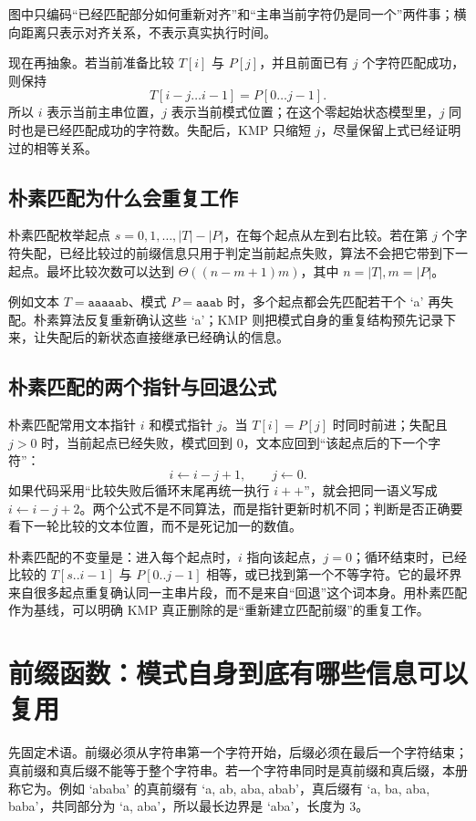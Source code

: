 \documentclass[UTF8,fontset=none,11pt,a4paper]{ctexart}
\begin{document}
\begin{center}
\resizebox{0.94\linewidth}{!}{}
\end{center}
图中只编码“已经匹配部分如何重新对齐”和“主串当前字符仍是同一个”两件事；横向距离只表示对齐关系，不表示真实执行时间。

现在再抽象。若当前准备比较 $T[i]$ 与 $P[j]$，并且前面已有 $j$ 个字符匹配成功，则保持
\[
T[i-j\ldots i-1]=P[0\ldots j-1].
\]
所以 $i$ 表示当前主串位置，$j$ 表示当前模式位置；在这个零起始状态模型里，$j$ 同时也是已经匹配成功的字符数。失配后，KMP 只缩短 $j$，尽量保留上式已经证明过的相等关系。

\subsection{朴素匹配为什么会重复工作}
朴素匹配枚举起点 $s=0,1,\ldots,\lvert T\rvert-\lvert P\rvert$，在每个起点从左到右比较。若在第 $j$ 个字符失配，已经比较过的前缀信息只用于判定当前起点失败，算法不会把它带到下一起点。最坏比较次数可以达到 $\Theta((n-m+1)m)$，其中 $n=\lvert T\rvert,m=\lvert P\rvert$。

例如文本 $T=\texttt{aaaaab}$、模式 $P=\texttt{aaab}$ 时，多个起点都会先匹配若干个 `a' 再失配。朴素算法反复重新确认这些 `a'；KMP 则把模式自身的重复结构预先记录下来，让失配后的新状态直接继承已经确认的信息。

\subsection{朴素匹配的两个指针与回退公式}
朴素匹配常用文本指针 $i$ 和模式指针 $j$。当 $T[i]=P[j]$ 时同时前进；失配且 $j>0$ 时，当前起点已经失败，模式回到 $0$，文本应回到“该起点后的下一个字符”：
\[
i\leftarrow i-j+1,\qquad j\leftarrow0.
\]
如果代码采用“比较失败后循环末尾再统一执行 $i++$”，就会把同一语义写成 $i\leftarrow i-j+2$。两个公式不是不同算法，而是指针更新时机不同；判断是否正确要看下一轮比较的文本位置，而不是死记加一的数值。

朴素匹配的不变量是：进入每个起点时，$i$ 指向该起点，$j=0$；循环结束时，已经比较的 $T[s..i-1]$ 与 $P[0..j-1]$ 相等，或已找到第一个不等字符。它的最坏界来自很多起点重复确认同一主串片段，而不是来自“回退”这个词本身。用朴素匹配作为基线，可以明确 KMP 真正删除的是“重新建立匹配前缀”的重复工作。

\section{前缀函数：模式自身到底有哪些信息可以复用}
先固定术语。前缀必须从字符串第一个字符开始，后缀必须在最后一个字符结束；真前缀和真后缀不能等于整个字符串。若一个字符串同时是真前缀和真后缀，本册称它为。例如 `ababa' 的真前缀有 `a, ab, aba, abab'，真后缀有 `a, ba, aba, baba'，共同部分为 `a, aba'，所以最长边界是 `aba'，长度为 3。
\end{document}
